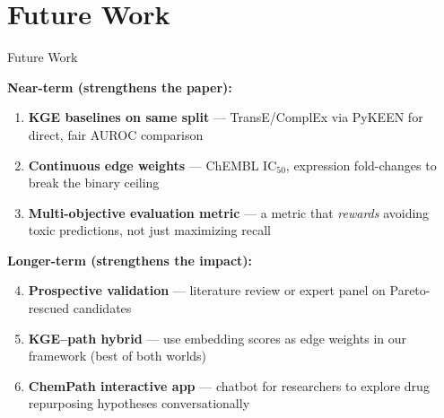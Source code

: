 \documentclass[aspectratio=169,11pt]{beamer}
\begin{document}
\section{Future Work}

\begin{frame}{Future Work}

\textbf{Near-term (strengthens the paper):}
\begin{enumerate}
    \item \textbf{KGE baselines on same split} --- TransE/ComplEx via PyKEEN
          for direct, fair AUROC comparison
    \item \textbf{Continuous edge weights} --- ChEMBL IC$_{50}$, expression
          fold-changes to break the binary ceiling
    \item \textbf{Multi-objective evaluation metric} --- a metric that \emph{rewards}
          avoiding toxic predictions, not just maximizing recall
\end{enumerate}

\vspace{1em}

\textbf{Longer-term (strengthens the impact):}
\begin{enumerate}
    \setcounter{enumi}{3}
    \item \textbf{Prospective validation} --- literature review or expert
          panel on Pareto-rescued candidates
    \item \textbf{KGE--path hybrid} --- use embedding scores as edge weights
          in our framework (best of both worlds)
    \item \textbf{ChemPath interactive app} --- chatbot for researchers
          to explore drug repurposing hypotheses conversationally
\end{enumerate}

\end{frame}

\end{document}
